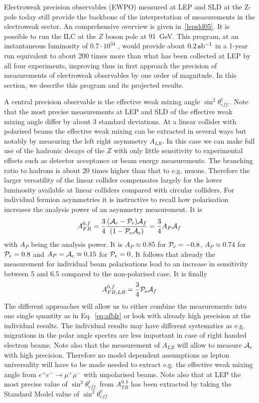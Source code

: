 

Electroweak precision observables (EWPO) measured at LEP and SLD at the Z-pole today still provide the backbone of the interpretation of measurements in the electroweak sector. An comprehensive overview is given in~\ref{lepsld05}.    
It is possible to run the ILC at the $Z$ boson pole at 91~GeV.   This
program, at an instantaneous luminosity of  $0.7\cdot10^{34}$ , would provide  about $0.2\,{\rm ab^{-1}}$ in a 1-year run equivalent to about 200 times more than what has been collected at LEP by all four experiments, improving thus in first approach the precision of measurements of electroweak observables by one order of magnitude.  In this section, we describe this program and its projected results. 

A central precision observable is the effective weak mixing angle $\sin^2\theta^{\ell}_{eff.}$. Note that the most precise measurements at LEP and SLD of the effective weak mixing angle differ by about 3 standard deviations. At a linear collider with polarised beams the effective weak mixing can be extracted in several ways but notably by measuring the left right asymmetry $A_{LR}$. In this case we can make full use of the hadronic decays of the $Z$ with only little sensitivity to experimental effects such as detector acceptance or beam energy measurements. The branching ratio to hadrons is about 20 times higher than that to e.g. muons. Therefore the larger versatility of the linear collider compensates largely for the lower luminosity available at linear colliders compared with circular colliders. 
For individual fermion asymmetries it is instructive to recall how polarisation increases the analysis power of an asymmetry measurement. It is \begin{equation}
A^{0,f}_{FB} = \frac{3}{4}\frac{({\cal A}_e - {\cal P}_e){\cal A}_f}{(1-{\cal P}_e{\cal A}_e)} =  \frac{3}{4} A_P {\cal A}_f  
\end{equation} 
with $A_P$ being the analysis power. It is $A_P\approx 0.85$ for ${\cal P}_e = -0.8$, $A_P\approx 0.74$ for ${\cal P}_e = 0.8$ and $A_P = {\cal A}_e \approx 0.15$ for ${\cal P}_e = 0$.
It follows that already the measurement for individual beam polarisations lead to an increase in sensitivity between 5 and 6.5 compared to the non-polarised case.    
It is finally 
\begin{equation}
A^{0,f}_{FB,LR} = \frac{3}{4} {\cal P}_e {\cal A}_f
\label{eq:afblr}
\end{equation}
The different approaches will allow us to either combine the measurements into one single quantity as in Eq.~\ref{eq:afblr} or look with already high precision at the individual results. The individual results may have different systematics as e.g. migrations in the polar angle spectra are less important in case of right handed electron beams. Note also that the measurement of $A_{LR}$ will allow to measure ${\cal A}_e$ with high precision. Therefore no model dependent assumptions as lepton universality will have to be made needed to extract e.g. the effective weak mixing angle from $e^+e^- \rightarrow \mu^+\mu^-$ with unpolarised beams. Note also that at LEP the most precise value of $\sin^2\theta^{\ell}_{eff.}$ from $A^{0,b}_{FB}$ has been extracted by taking the Standard Model value of $\sin^2\theta^{b}_{eff.}$   
